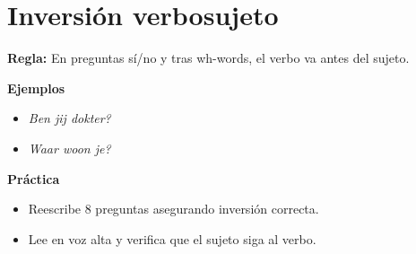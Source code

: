 \section{Inversión verbo\textendash{}sujeto}
\textbf{Regla:} En preguntas sí/no y tras wh-words, el verbo va antes del sujeto.

\textbf{Ejemplos}
\begin{itemize}[leftmargin=*]
  \item \textit{Ben jij dokter?}
  \item \textit{Waar woon je?}
\end{itemize}

\textbf{Práctica}
\begin{itemize}[leftmargin=*]
  \item Reescribe 8 preguntas asegurando inversión correcta.
  \item Lee en voz alta y verifica que el sujeto siga al verbo.
\end{itemize}
